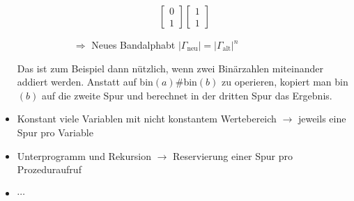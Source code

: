 \documentclass{scrartcl}%
\begin{document}
\begin{itemize}
{\begin{figure}[H]
\begin{subfigure}{0.3\textwidth}
\begin{equation*}
                    \begin{bmatrix}
                        0 \\
                        1
                    \end{bmatrix}
                    \begin{bmatrix}
                        1 \\
                        1
                    \end{bmatrix}
                \end{equation*}
            \end{subfigure}%
            \raggedright
            \begin{subfigure}{.7\textwidth}
                $\Rightarrow$ Neues Bandalphabt $|\Gamma_{\text{neu}} | = |\Gamma_{\text{alt}}|^n$
            \end{subfigure}
        \end{figure}
        Das ist zum Beispiel dann nützlich, wenn zwei Binärzahlen miteinander addiert werden.
        Anstatt auf bin$(a)\#$bin$(b)$ zu operieren,
        kopiert man bin$(b)$ auf die zweite Spur und berechnet in der dritten Spur das Ergebnis.
        }
        \item Konstant viele Variablen mit nicht konstantem Wertebereich $\rightarrow$ jeweils eine Spur pro Variable
        \item Unterprogramm und Rekursion $\rightarrow$ Reservierung einer Spur pro Prozeduraufruf
        \item $\cdots$
    \end{itemize}

    \newpage
\end{document}
